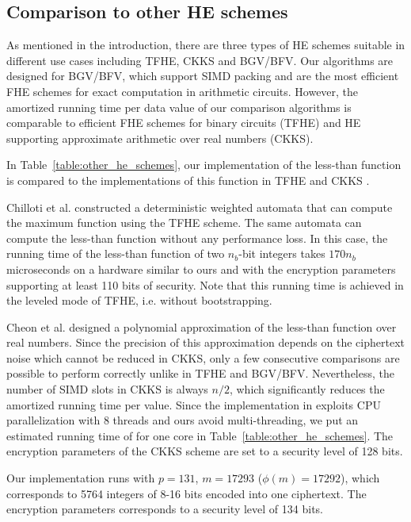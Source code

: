 \subsection{Comparison to other HE schemes}
    As mentioned in the introduction, there are three types of HE schemes suitable in different use cases including TFHE, CKKS and BGV/BFV.
    Our algorithms are designed for BGV/BFV, which support SIMD packing and are the most efficient FHE schemes for exact computation in arithmetic circuits.
    However, the amortized running time per data value of our comparison algorithms is comparable to efficient FHE schemes for binary circuits (TFHE) and HE supporting approximate arithmetic over real numbers (CKKS). 

    In Table~\ref{table:other_he_schemes}, our implementation of the less-than function is compared to the implementations of this function in TFHE \cite{AC:CGGI17} and CKKS \cite{EPRINT:CheKimKim19}.

    Chilloti et al. \cite{AC:CGGI17} constructed a deterministic weighted automata that can compute the maximum function using the TFHE scheme.
    The same automata can compute the less-than function without any performance loss. 
    In this case, the running time of the less-than function of two $n_b$-bit integers takes $170 n_b$ microseconds on a hardware similar to ours and with the encryption parameters supporting at least 110 bits of security.
    Note that this running time is achieved in the leveled mode of TFHE, i.e. without bootstrapping.

    Cheon et al. \cite{EPRINT:CheKimKim19} designed a polynomial approximation of the less-than function over real numbers.
    Since the precision of this approximation depends on the ciphertext noise which cannot be reduced in CKKS, only a few consecutive comparisons are possible to perform correctly unlike in TFHE and BGV/BFV.
    Nevertheless, the number of SIMD slots in CKKS is always $n/2$, which significantly reduces the amortized running time per value.
    Since the implementation in \cite{EPRINT:CheKimKim19} exploits CPU parallelization with 8 threads and ours avoid multi-threading, we put an estimated running time of \cite{EPRINT:CheKimKim19} for one core in Table~\ref{table:other_he_schemes}.
    The encryption parameters of the CKKS scheme are set to a security level of 128 bits.

    Our implementation runs with $p=131$, $m=17293$ ($\phi(m)=17292$), which corresponds to 5764 integers of 8-16 bits encoded into one ciphertext.
    The encryption parameters corresponds to a security level of 134 bits.
    
